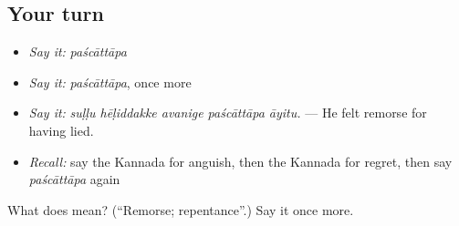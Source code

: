 \subsection*{Your turn}
\begin{itemize}
\raggedright
  \item \emph{Say it:} \emph{paścāttāpa}
  \item \emph{Say it:} \emph{paścāttāpa}, once more
  \item \emph{Say it:} \emph{suḷḷu hēḷiddakke avanige paścāttāpa āyitu.} — He felt remorse for having lied.
  \item \emph{Recall:} say the Kannada for anguish, then the Kannada for regret, then say \emph{paścāttāpa} again
\end{itemize}

\begin{tcolorbox}[breakable,colback=teal!4,colframe=teal!35!black,title={Before you move on}]
What does  mean? (\textquotedblleft{}Remorse; repentance\textquotedblright{}.) Say it once more.
\end{tcolorbox}
